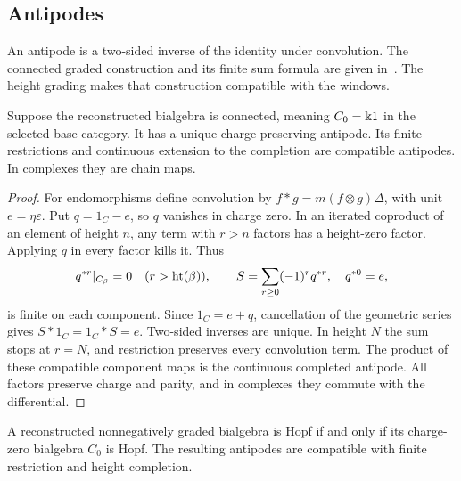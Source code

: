 \subsection{Antipodes}

An antipode is a two-sided inverse of the identity under convolution.
The connected graded construction and its finite sum formula are given
in~\cite[Propositions 1.4.14 and 1.4.22, pp.~15, 17]{GrinbergReiner}.
The height grading makes that construction compatible with the windows.

\begin{proposition}\label{connected-antipode}
Suppose the reconstructed bialgebra is connected, meaning $C_0=\Bbbk1$
in the selected base category.  It has a unique charge-preserving
antipode.  Its finite restrictions and continuous extension to the
completion are compatible antipodes.  In complexes they are chain maps.
\end{proposition}

\begin{proof}
For endomorphisms define convolution by
$f*g=m(f\otimes g)\Delta$, with unit $e=\eta\varepsilon$.
Put $q=1_C-e$, so $q$ vanishes in charge zero.
In an iterated coproduct of an element of height $n$, any term with
$r>n$ factors has a height-zero factor.  Applying $q$ in every factor
kills it.  Thus
\[
 q^{*r}|_{C_\beta}=0\quad(r>\operatorname{ht}(\beta)),\qquad
 S=\sum_{r\geq0}(-1)^rq^{*r},\quad q^{*0}=e,
\]
is finite on each component.  Since $1_C=e+q$, cancellation of the
geometric series gives $S*1_C=1_C*S=e$.
Two-sided inverses are unique.  In height $N$ the sum stops at $r=N$,
and restriction preserves every convolution term.
The product of these compatible component maps is the continuous
completed antipode.  All factors preserve charge and parity, and in
complexes they commute with the differential.
\end{proof}

\begin{proposition}\label{degree-zero-hopf}
A reconstructed nonnegatively graded bialgebra is Hopf if and only if
its charge-zero bialgebra $C_0$ is Hopf.  The resulting antipodes are
compatible with finite restriction and height completion.
\end{proposition}

